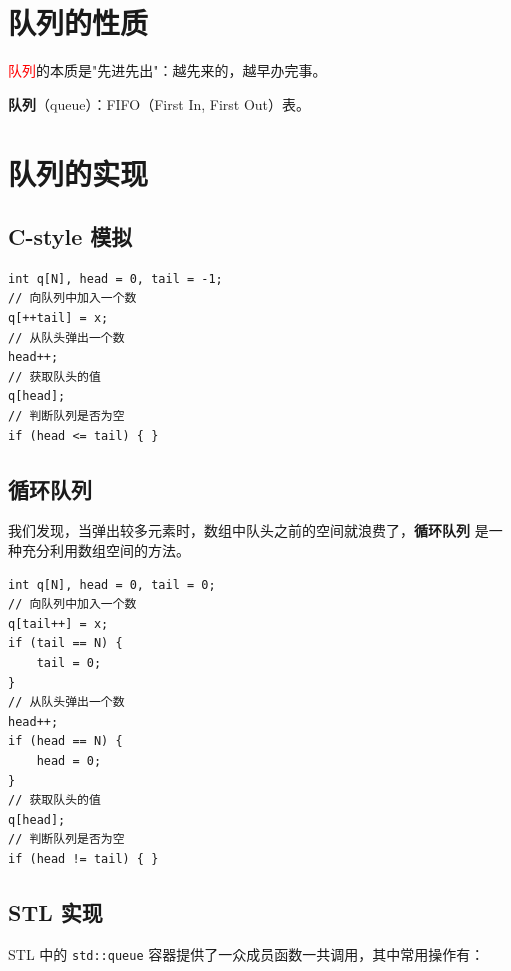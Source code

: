 \documentclass{report}
\begin{document}
\section{队列的性质}

\textcolor{red}{队列}的本质是"先进先出"：越先来的，越早办完事。

\textbf{队列}（queue）：FIFO（First In, First Out）表。

\section{队列的实现}

\subsection{C-style 模拟}

\begin{verbatim}
int q[N], head = 0, tail = -1;
// 向队列中加入一个数
q[++tail] = x;
// 从队头弹出一个数
head++;
// 获取队头的值
q[head];
// 判断队列是否为空
if (head <= tail) { }
\end{verbatim}

\subsection{循环队列}

我们发现，当弹出较多元素时，数组中队头之前的空间就浪费了，\textbf{循环队列} 是一种充分利用数组空间的方法。

\begin{verbatim}
int q[N], head = 0, tail = 0;
// 向队列中加入一个数
q[tail++] = x;
if (tail == N) {
    tail = 0;
}
// 从队头弹出一个数
head++;
if (head == N) {
    head = 0;
}
// 获取队头的值
q[head];
// 判断队列是否为空
if (head != tail) { }
\end{verbatim}

\subsection{STL 实现}

STL 中的 \texttt{std::queue} 容器提供了一众成员函数一共调用，其中常用操作有：
\end{document}
